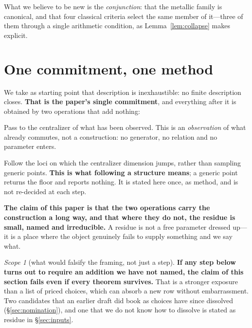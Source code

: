 \documentclass[11pt,reqno]{amsart}
\theoremstyle{plain}
\theoremstyle{definition}
\theoremstyle{remark}
\newtheorem{scope}[theorem]{Scope}
\begin{document}
What we believe to be new is the \emph{conjunction}: that the metallic family is
canonical, and that four classical criteria select the same member of it---three of
them through a single arithmetic condition, as Lemma~\ref{lem:collapse} makes explicit.

\section{One commitment, one method}\label{sec:price}

We take as starting point that description is inexhaustible: no finite description
closes. \textbf{That is the paper's single commitment}, and everything after it is
obtained by two operations that add nothing:

\begin{description}[leftmargin=1.9em,style=nextline,itemsep=2pt]
\item[\textnormal{\textbf{Measure.}}] Pass to the centralizer of what has been observed.
  This is an \emph{observation} of what already commutes, not a construction: no
  generator, no relation and no parameter enters.
\item[\textnormal{\textbf{Track.}}] Follow the loci on which the centralizer dimension
  jumps, rather than sampling generic points. \textbf{This is what following a structure
  means}; a generic point returns the floor and reports nothing. It is stated here once,
  as method, and is not re-decided at each step.
\end{description}

\noindent\textbf{The claim of this paper is that the two operations carry the
construction a long way, and that where they do not, the residue is small, named and
irreducible.} A residue is not a free parameter dressed up---it is a place where the
object genuinely fails to supply something and we say what.

\begin{scope}[what would falsify the framing, not just a step]\label{sc:framing}
\textbf{If any step below turns out to require an addition we have not named, the claim
of this section fails even if every theorem survives.} That is a stronger exposure than
a list of priced choices, which can absorb a new row without embarrassment. Two
candidates that an earlier draft did book as choices have since dissolved
(\S\ref{sec:nomination}), and one that we do not know how to dissolve is stated as
residue in \S\ref{sec:inputs}.
\end{scope}
\end{document}
